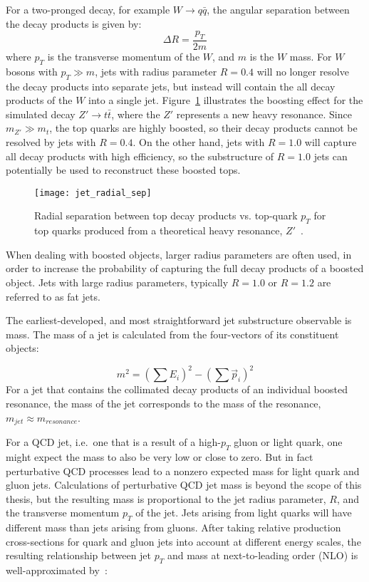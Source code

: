 For a two-pronged decay, for example $W \rightarrow q\bar{q}$, the angular separation between the decay products is given by:
\begin{equation}\label{eq:jet_boosted_sep}
    \Delta R = \frac{p_{T}}{2m}
\end{equation}
where $p_T$ is the transverse momentum of the $W$, and $m$ is the $W$ mass.
For $W$ bosons with $p_T \gg m$, jets with radius parameter $R = 0.4$ will no longer resolve the decay products into separate jets,
but instead will contain the all decay products of the $W$ into a single jet.
Figure~\ref{fig:jet_radial_sep} illustrates the boosting effect for the simulated decay $Z'\rightarrow t\bar{t}$, where the $Z'$ represents a new heavy resonance.
Since $m_{Z'} \gg m_{t}$, the top quarks are highly boosted, so their decay products cannot be resolved by jets with $R=0.4$.
On the other hand, jets with $R = 1.0$ will capture all decay products with high efficiency, so the substructure of $R=1.0$ jets can potentially be used to reconstruct these boosted tops.

\begin{figure}[!ht]
    \centering
\texttt{[image: jet\_radial\_sep]}
\caption{Radial separation between top decay products vs. top-quark $p_T$ for top quarks produced from a theoretical heavy resonance, $Z'$~\cite{jet-substructure-perf}.}
\label{fig:jet_radial_sep}
\end{figure}

When dealing with boosted objects, larger radius parameters are often used, in order to increase the probability of capturing the full decay products of a boosted object.
Jets with large radius parameters, typically $R=1.0$ or $R=1.2$ are referred to as fat jets.

The earliest-developed, and most straightforward jet substructure observable is mass.
The mass of a jet is calculated from the four-vectors of its constituent objects:

\begin{equation}\label{eq:jet_mass}
    m^2 = \left(\sum E_i\right)^2 - \left(\sum \vec{p}_i \right)^2
\end{equation}
For a jet that contains the collimated decay products of an individual boosted resonance, the mass of the jet corresponds to the mass of the resonance, $m_{jet} \approx m_{resonance}$.

For a QCD jet, i.e.\ one that is a result of a high-$p_T$ gluon or light quark, one might expect the mass to also be very low or close to zero.
But in fact perturbative QCD processes lead to a nonzero expected mass for light quark and gluon jets.
Calculations of perturbative QCD jet mass is beyond the scope of this thesis, but the resulting mass is proportional to the jet radius parameter, $R$, and the transverse momentum $p_T$ of the jet.
Jets arising from light quarks will have different mass than jets arising from gluons.
After taking relative production cross-sections for quark and gluon jets into account at different energy scales, the resulting relationship between jet $p_T$ and mass at next-to-leading order (NLO) is well-approximated by~\cite{jet-mass-nlo}:

